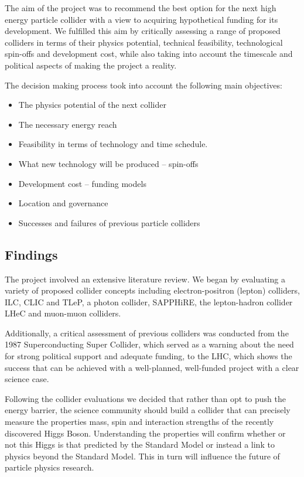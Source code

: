 The aim of the project was to recommend the best option for the next high energy particle collider with a view to acquiring hypothetical funding for its development. We fulfilled this aim by critically assessing a range of proposed colliders in terms of their physics potential, technical feasibility, technological spin-offs and development cost, while also taking into account the timescale and political aspects of making the project a reality.

The decision making process took into account the following main objectives:

\begin{itemize}
	\item The physics potential of the next collider
    \item The necessary energy reach
    \item Feasibility in terms of technology and time schedule.
    \item What new technology will be produced – spin-offs
    \item Development cost – funding models
    \item Location and governance
    \item Successes and failures of previous particle colliders
\end{itemize}

\subsection{Findings}

The project involved an extensive literature review. We began by evaluating a variety of proposed collider concepts including electron-positron (lepton) colliders, ILC, CLIC and TLeP, a photon collider, SAPPHiRE, the lepton-hadron collider LHeC and muon-muon colliders.

Additionally, a critical assessment of previous colliders was conducted from the 1987 Superconducting Super Collider, which served as a warning about the need for strong political support and adequate funding, to the LHC, which shows the success that can be achieved with a well-planned, well-funded project with a clear science case.

Following the collider evaluations we decided that rather than opt to push the energy barrier, the science community should build a collider that can precisely measure the properties \textendash mass, spin and interaction strengths \textendash of the recently discovered Higgs Boson. Understanding the properties will confirm whether or not this Higgs is that predicted by the Standard Model or instead a link to physics beyond the Standard Model. This in turn will influence the future of particle physics research.

